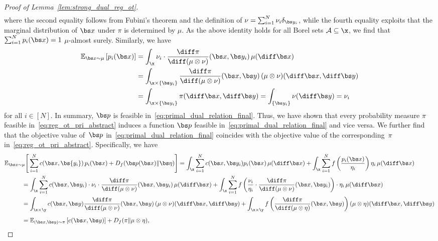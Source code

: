 \documentclass[11pt, a4paper, oneside, reqno]{article}
\begin{document}
\begin{proof}[Proof of Lemma~\ref{lem:strong_dual_reg_ot}]
\begin{align*}
		\end{align*}
		where the second equality follows from Fubini's theorem and the definition of $\nu=\sum_{i=1}^N\nu_i\delta_{\bs y_i}$, while the fourth equality exploits that the marginal distribution of $\bs x$ under $\pi$ is determined by $\mu$. As the above identity holds for all Borel sets $\mathcal A\subseteq \x$, we find that $\sum_{i=1}^N p_i(\bs x)=1$ $\mu$-almost surely. Similarly, we have
		\begin{align*}
		\mathbb E_{\bs x\sim\mu}\left[ p_i(\bs x)\right] &=\int_\x \nu_i\cdot  \frac{\diff \pi}{\diff (\mu \otimes \nu)} (\bs x, \bs y_i) \,\mu(\diff\bs x) \\ &=\int_{\x\times\{\bs y_i\}} \frac{\diff \pi}{\diff (\mu \otimes \nu)} (\bs x, \bs y) \,(\mu\otimes\nu)(\diff\bs x,\diff\bs y) \\ &= \int_{\x\times\{\bs y_i\}} \pi(\diff\bs x,\diff\bs y)=\int_{\{\bs y_i\}}\nu(\diff \bs y)=\nu_i
		\end{align*}
		for all $i\in[N]$. In summary, $\bs p$ is feasible in~\eqref{eq:primal_dual_relation_final}. Thus, we have shown that every probability measure $\pi$ feasible in~\eqref{eq:reg_ot_pri_abstract} induces a function $\bs p$ feasible in~\eqref{eq:primal_dual_relation_final} and vice versa. We further find that the objective value of~$\bs p$ in~\eqref{eq:primal_dual_relation_final} coincides with the objective value of the corresponding~$\pi$ in~\eqref{eq:reg_ot_pri_abstract}. Specifically, we have
		\begin{align*}
		& \mathbb{E}_{\bs x \sim \mu}\Bigg[ \sum\limits_{i=1}^N c(\bs x, \bs {y_i})\, p_{i}(\bs x) +\displaystyle D_f (\bs p(\bs x) \| \bs \eta) \Bigg] =\displaystyle\int_\x \sum\limits_{i=1}^N c(\bs x, \bs y_i) p_i(\bs x) \,\mu( \diff\bs x) + \displaystyle\int_\x\sum_{i=1}^N f\left(\frac{p_i(\bs x)}{\eta_i}\right) \eta_i \, \mu (\diff \bs x) \\ &\hspace{1cm}=\displaystyle\int_\x \sum\limits_{i=1}^N c(\bs x, \bs y_i) \cdot\nu_i\cdot \frac{\diff \pi}{\diff(\mu \otimes \nu)}(\bs x, \bs y_i)\, \mu( \diff\bs x) +  \int_\x \sum_{i=1}^N f\left( \frac{\nu_i}{\eta_i} \cdot \frac{\diff \pi}{\diff(\mu \otimes \nu)}(\bs x, \bs y_i)\right) \cdot \eta_i \,\mu ( \diff \bs x) \\ &\hspace{1cm}=\displaystyle\int_{\x\times \y} c(\bs x, \bs y)\frac{\diff \pi}{\diff(\mu \otimes \nu)}(\bs x, \bs y) \,(\mu \otimes \nu)(\diff\bs x,  \diff\bs y) +  \displaystyle\int_{\x\times\y} f\left( \frac{\diff \pi}{\diff(\mu \otimes \eta)}(\bs x, \bs y)\right) (\mu\otimes \eta)(\diff \bs x,\diff \bs y) \\[1ex] &\hspace{1cm}=\mathbb E_{(\bs x, \bs y) \sim \pi} \left[c(\bs x, \bs y)\right] +  D_f(\pi \| \mu \otimes \eta),

\end{align*}
\end{proof}
\end{document}
